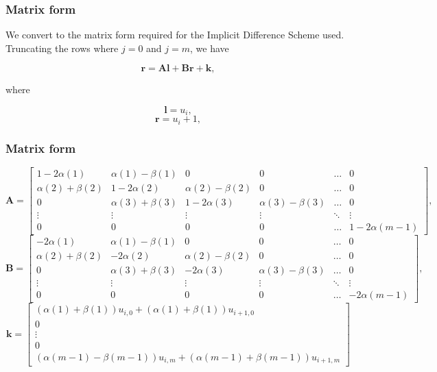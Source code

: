 \documentclass{beamer}
\begin{document}
  \begin{frame}
    \frametitle{Matrix form}
    We convert to the matrix form required for the Implicit Difference Scheme used. Truncating the rows where \(j=0\) and \(j=m\), we have

    \begin{equation}
      \textbf{r} = \textbf{Al} + \textbf{Br} + \textbf{k},
    \end{equation}

    where

    \begin{equation}
      \textbf{l} = u_{i},
    \end{equation}
    \begin{equation}
      \textbf{r} = u_i+1,
    \end{equation}
  \end{frame}

  \begin{frame}
    \frametitle{Matrix form}
    \tiny
    \begin{equation}
      \textbf{A} = \begin{bmatrix}
        1-2\alpha(1) & \alpha(1) - \beta(1) & 0 & 0 & \hdots & 0 \\
        \alpha(2) + \beta(2) & 1-2\alpha(2) & \alpha(2) - \beta(2) & 0 & \hdots & 0 \\
        0 & \alpha(3) + \beta(3) & 1-2\alpha(3) & \alpha(3) - \beta(3) & \hdots & 0 \\
        \vdots & \vdots & \vdots & \vdots & \ddots & \vdots \\
        0 & 0 & 0 & 0 & \hdots & 1-2\alpha(m-1)
      \end{bmatrix},
    \end{equation}
    \begin{equation}
      \textbf{B} = \begin{bmatrix}
        -2\alpha(1) & \alpha(1) - \beta(1) & 0 & 0 & \hdots & 0 \\
        \alpha(2) + \beta(2) & -2\alpha(2) & \alpha(2) - \beta(2) & 0 & \hdots & 0 \\
        0 & \alpha(3) + \beta(3) & -2\alpha(3) & \alpha(3) - \beta(3) & \hdots & 0 \\
        \vdots & \vdots & \vdots & \vdots & \ddots & \vdots \\
        0 & 0 & 0 & 0 & \hdots & -2\alpha(m-1)
      \end{bmatrix},
    \end{equation}
    \begin{equation}
      \textbf{k} = \begin{bmatrix}
        (\alpha(1) + \beta(1))u_{i, 0} + (\alpha(1) + \beta(1))u_{i+1, 0} \\
        0 \\
        \vdots \\
        0 \\
        (\alpha(m-1) - \beta(m-1))u_{i, m} + (\alpha(m-1) + \beta(m-1))u_{i+1, m}
      \end{bmatrix}
    \end{equation}
  \end{frame}
\end{document}
